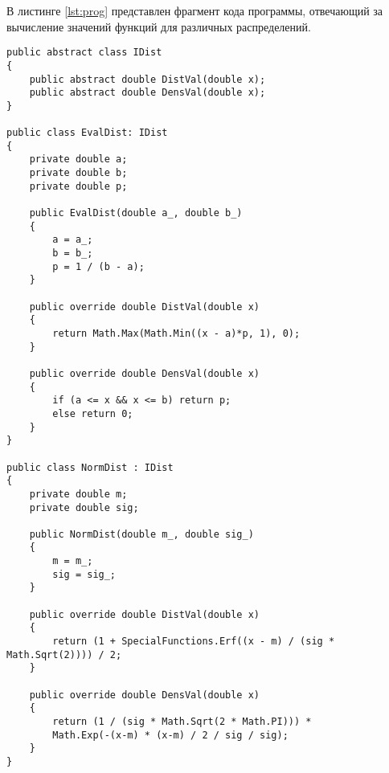 В листинге \ref{lst:prog} представлен фрагмент кода программы, отвечающий за вычисление значений функций для различных распределений.

\begin{lstlisting}[caption = {Вычисление функций распредлений}, label=lst:prog]
public abstract class IDist
{
	public abstract double DistVal(double x);
	public abstract double DensVal(double x);
}

public class EvalDist: IDist
{
	private double a;
	private double b;
	private double p;
	
	public EvalDist(double a_, double b_)
	{
		a = a_;
		b = b_;
		p = 1 / (b - a);
	}
	
	public override double DistVal(double x)
	{
		return Math.Max(Math.Min((x - a)*p, 1), 0);
	}
	
	public override double DensVal(double x)
	{
		if (a <= x && x <= b) return p;
		else return 0;
	}
}

public class NormDist : IDist
{
	private double m;
	private double sig;
	
	public NormDist(double m_, double sig_)
	{
		m = m_;
		sig = sig_;
	}
	
	public override double DistVal(double x)
	{
		return (1 + SpecialFunctions.Erf((x - m) / (sig * Math.Sqrt(2)))) / 2;
	}
	
	public override double DensVal(double x)
	{
		return (1 / (sig * Math.Sqrt(2 * Math.PI))) *
		Math.Exp(-(x-m) * (x-m) / 2 / sig / sig);
	}
}
\end{lstlisting}
